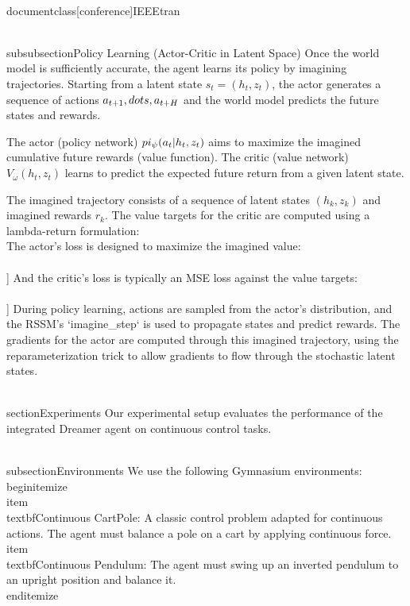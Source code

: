 \\documentclass[conference]{IEEEtran}
\begin{document}
\\subsubsection{Policy Learning (Actor-Critic in Latent Space)}
Once the world model is sufficiently accurate, the agent learns its policy by imagining trajectories. Starting from a latent state \( s_t = (h_t, z_t) \), the actor generates a sequence of actions \( a_{t+1}, \\dots, a_{t+H} \) and the world model predicts the future states and rewards.

The actor (policy network) \( \\pi_{\psi}(a_t | h_t, z_t) \) aims to maximize the imagined cumulative future rewards (value function). The critic (value network) \( V_{\omega}(h_t, z_t) \) learns to predict the expected future return from a given latent state.

The imagined trajectory consists of a sequence of latent states \( (h_k, z_k) \) and imagined rewards \( r_k \). The value targets for the critic are computed using a lambda-return formulation:
\\[ V_{target}(s_t) = r_t + \\gamma ( (1-\\lambda) V(s_{t+1}) + \\lambda V_{target}(s_{t+1}) ) \\]
The actor's loss is designed to maximize the imagined value:
\\[ \\mathcal{L}_{actor} = -\\mathbb{E}[V_{\text{target}}(s_t)] \\]
And the critic's loss is typically an MSE loss against the value targets:
\\[ \\mathcal{L}_{critic} = \\frac{1}{2} \\mathbb{E}[(V(s_t) - V_{\text{target}}(s_t))^2] \\]
During policy learning, actions are sampled from the actor's distribution, and the RSSM's `imagine_step` is used to propagate states and predict rewards. The gradients for the actor are computed through this imagined trajectory, using the reparameterization trick to allow gradients to flow through the stochastic latent states.

\\section{Experiments}
Our experimental setup evaluates the performance of the integrated Dreamer agent on continuous control tasks.

\\subsection{Environments}
We use the following Gymnasium environments:
\\begin{itemize}
    \\item \\textbf{Continuous CartPole}: A classic control problem adapted for continuous actions. The agent must balance a pole on a cart by applying continuous force.
    \\item \\textbf{Continuous Pendulum}: The agent must swing up an inverted pendulum to an upright position and balance it.
\\end{itemize}
\end{document}
